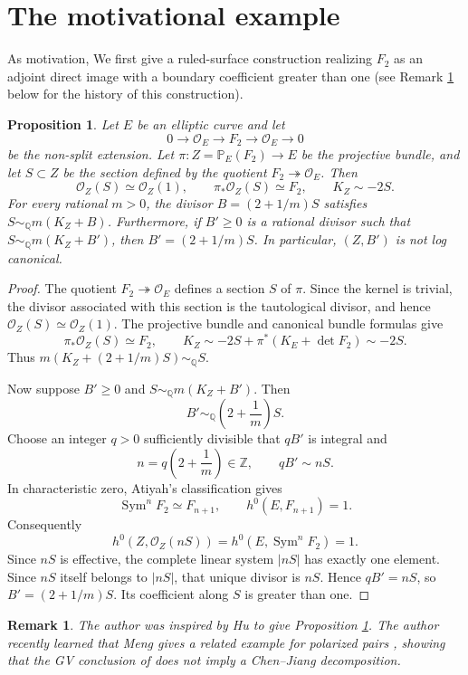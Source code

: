 \documentclass[11pt,letterpaper]{article}
\theoremstyle{paper}
\newtheorem{proposition}[theorem]{Proposition}
\newtheorem{remark}[theorem]{Remark}
\newcommand{\OO}{\mathcal O}
\newcommand{\PP}{\mathbb P}
\newcommand{\QQ}{\mathbb Q}
\newcommand{\ZZ}{\mathbb Z}
\newcommand{\simQ}{\sim_{\QQ}}
\begin{document}
\section{The motivational example}
As motivation, We first give a ruled-surface construction realizing $F_2$ as an adjoint direct image with a boundary coefficient greater than one (see Remark \ref{remark2.2} below for the history of this construction).
\begin{proposition}\label{ex:ruled}
Let $E$ be an elliptic curve and let
\[
0\longrightarrow\OO_E\longrightarrow F_2\longrightarrow\OO_E\longrightarrow0
\]
be the non-split extension. Let $\pi:Z=\PP_E(F_2)\to E$ be the projective bundle, and let $S\subset Z$ be the section defined by the quotient $F_2\twoheadrightarrow\OO_E$. Then
\[
\OO_Z(S)\simeq\OO_Z(1),\qquad \pi_*\OO_Z(S)\simeq F_2,\qquad K_Z\sim-2S.
\]
For every rational $m>0$, the divisor $B=(2+1/m)S$ satisfies $S\simQ m(K_Z+B)$. Furthermore, if $B'\ge0$ is a rational divisor such that $S\simQ m(K_Z+B')$, then $B'=(2+1/m)S$. In particular, $(Z,B')$ is not log canonical.
\end{proposition}
\begin{proof}
The quotient $F_2\twoheadrightarrow\OO_E$ defines a section $S$ of $\pi$. Since the kernel is trivial, the divisor associated with this section is the tautological divisor, and hence $\OO_Z(S)\simeq\OO_Z(1)$. The projective bundle and canonical bundle formulas give
\[
\pi_*\OO_Z(S)\simeq F_2,\qquad K_Z\sim-2S+\pi^*(K_E+\det F_2)\sim-2S.
\]
Thus $m(K_Z+(2+1/m)S)\simQ S$.

Now suppose $B'\ge0$ and $S\simQ m(K_Z+B')$. Then
\[
B'\simQ\left(2+\frac1m\right)S.
\]
Choose an integer $q>0$ sufficiently divisible that $qB'$ is integral and
\[
n=q\left(2+\frac1m\right)\in\ZZ,\qquad qB'\sim nS.
\]
In characteristic zero, Atiyah's classification \cite{Atiyah} gives
\[
\operatorname{Sym}^nF_2\simeq F_{n+1},\qquad h^0(E,F_{n+1})=1.
\]
Consequently
\[
h^0(Z,\OO_Z(nS))=h^0(E,\operatorname{Sym}^nF_2)=1.
\]
Since $nS$ is effective, the complete linear system $|nS|$ has exactly one element. Since $nS$ itself belongs to $|nS|$, that unique divisor is $nS$. Hence $qB'=nS$, so $B'=(2+1/m)S$. Its coefficient along $S$ is greater than one.
\end{proof}

\begin{remark}\label{remark2.2}
The author was inspired by Hu \cite[Example 4.5]{Hu} to give Proposition \ref{ex:ruled}. The author recently learned that Meng gives a related example for polarized pairs \cite[Example 4.3]{MengAdjoint}, showing that the GV conclusion of \cite[Theorem 1.4]{MengAdjoint} does not imply a Chen--Jiang decomposition.
\end{remark}
\end{document}
